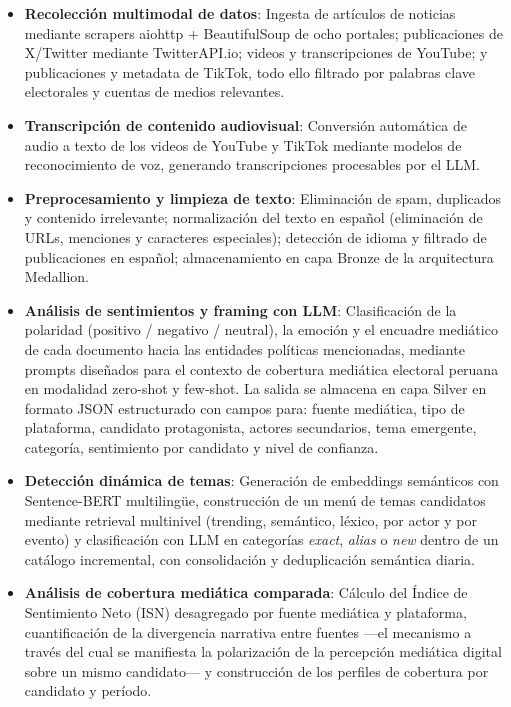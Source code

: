 \begin{itemize}
    \item \textbf{Recolección multimodal de datos}: Ingesta de artículos de noticias mediante scrapers aiohttp + BeautifulSoup de ocho portales; publicaciones de X/Twitter mediante TwitterAPI.io; videos y transcripciones de YouTube; y publicaciones y metadata de TikTok, todo ello filtrado por palabras clave electorales y cuentas de medios relevantes.

    \item \textbf{Transcripción de contenido audiovisual}: Conversión automática de audio a texto de los videos de YouTube y TikTok mediante modelos de reconocimiento de voz, generando transcripciones procesables por el LLM.

    \item \textbf{Preprocesamiento y limpieza de texto}: Eliminación de spam, duplicados y contenido irrelevante; normalización del texto en español (eliminación de URLs, menciones y caracteres especiales); detección de idioma y filtrado de publicaciones en español; almacenamiento en capa Bronze de la arquitectura Medallion.

    \item \textbf{Análisis de sentimientos y framing con LLM}: Clasificación de la polaridad (positivo / negativo / neutral), la emoción y el encuadre mediático de cada documento hacia las entidades políticas mencionadas, mediante prompts diseñados para el contexto de cobertura mediática electoral peruana en modalidad zero-shot y few-shot. La salida se almacena en capa Silver en formato JSON estructurado con campos para: fuente mediática, tipo de plataforma, candidato protagonista, actores secundarios, tema emergente, categoría, sentimiento por candidato y nivel de confianza.

    \item \textbf{Detección dinámica de temas}: Generación de embeddings semánticos con Sentence-BERT multilingüe, construcción de un menú de temas candidatos mediante retrieval multinivel (trending, semántico, léxico, por actor y por evento) y clasificación con LLM en categorías \textit{exact}, \textit{alias} o \textit{new} dentro de un catálogo incremental, con consolidación y deduplicación semántica diaria.

    \item \textbf{Análisis de cobertura mediática comparada}: Cálculo del Índice de Sentimiento Neto (ISN) desagregado por fuente mediática y plataforma, cuantificación de la divergencia narrativa entre fuentes —el mecanismo a través del cual se manifiesta la polarización de la percepción mediática digital sobre un mismo candidato— y construcción de los perfiles de cobertura por candidato y período.


\end{itemize}
